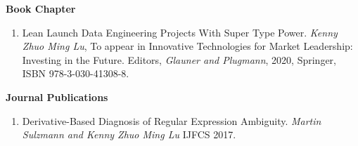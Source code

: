 \documentclass[margin,line]{res}
\begin{document}
\begin{resume}
{{\bf Book Chapter}
\begin{enumerate}
\item Lean Launch Data Engineering Projects With Super
    Type Power. \textit{Kenny Zhuo Ming Lu}, To appear in Innovative
    Technologies for Market Leadership: Investing in the
    Future. Editors, \textit{Glauner and Plugmann}, 2020, Springer,
    ISBN 978-3-030-41308-8.
\end{enumerate}



{\bf Journal Publications}
\begin{enumerate}
\item Derivative-Based Diagnosis of Regular Expression
  Ambiguity. \textit{Martin Sulzmann and Kenny Zhuo Ming Lu} IJFCS 2017.
\end{enumerate}


}
\end{resume}
\end{document}
